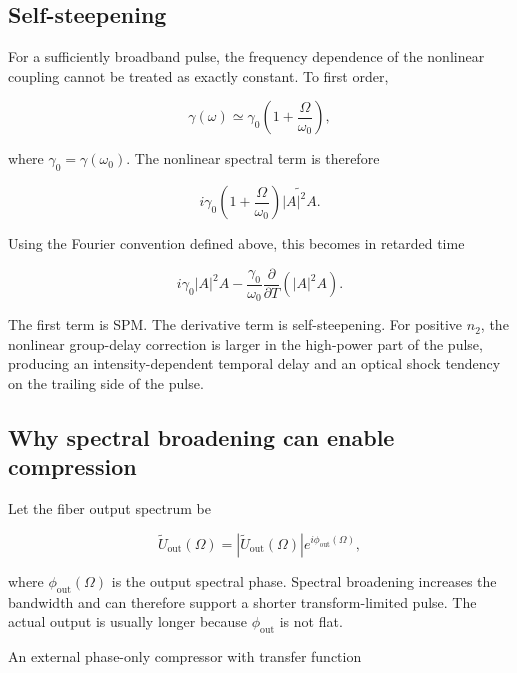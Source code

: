 \documentclass[11pt,a4paper]{article}
\begin{document}
\subsection{Self-steepening}

For a sufficiently broadband pulse, the frequency dependence of the nonlinear
coupling cannot be treated as exactly constant. To first order,

\begin{equation}
\gamma(\omega)
\simeq
\gamma_0\left(1+\frac{\Omega}{\omega_0}\right),
\end{equation}

where $\gamma_0=\gamma(\omega_0)$. The nonlinear spectral term is therefore

\begin{equation}
 i\gamma_0
 \left(1+\frac{\Omega}{\omega_0}\right)
 \widetilde{|A|^2A}.
\end{equation}

Using the Fourier convention defined above, this becomes in retarded time

\begin{equation}
\boxed{
 i\gamma_0|A|^2A
 -\frac{\gamma_0}{\omega_0}
 \frac{\partial}{\partial T}\left(|A|^2A\right).
}
\end{equation}

The first term is SPM. The derivative term is self-steepening. For positive
$n_2$, the nonlinear group-delay correction is larger in the high-power part
of the pulse, producing an intensity-dependent temporal delay and an optical
shock tendency on the trailing side of the pulse.

\subsection{Why spectral broadening can enable compression}

Let the fiber output spectrum be

\begin{equation}
\widetilde U_{\mathrm{out}}(\Omega)
=
\left|\widetilde U_{\mathrm{out}}(\Omega)\right|
 e^{i\phi_{\mathrm{out}}(\Omega)},
\end{equation}

where $\phi_{\mathrm{out}}(\Omega)$ is the output spectral phase. Spectral
broadening increases the bandwidth and can therefore support a shorter
transform-limited pulse. The actual output is usually longer because
$\phi_{\mathrm{out}}$ is not flat.

An external phase-only compressor with transfer function
\end{document}
